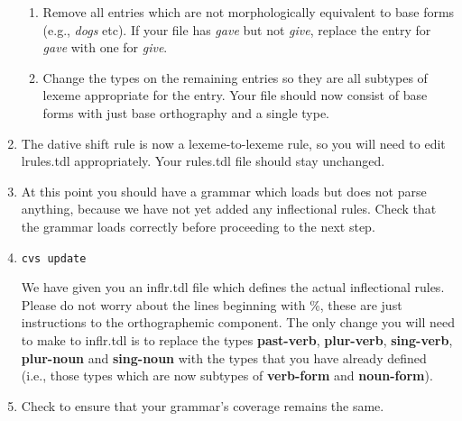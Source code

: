 \documentclass[10pt]{article}
\begin{document}
\begin{enumerate}
\begin{enumerate}
\item Remove all entries which
are not morphologically equivalent to
base forms (e.g., {\it dogs} etc).  If your file has {\it gave}
but not {\it give}, replace the entry for {\it gave} with one for {\it give}.
\item Change the types on the remaining entries so they are all
subtypes of lexeme appropriate for the entry.  Your file should
now consist of base forms with just base orthography and a single type.
\end{enumerate}
\item The dative shift rule is now a lexeme-to-lexeme rule, so you will need
to edit lrules.tdl appropriately.
Your rules.tdl file should stay unchanged.
\item At this point you should have a grammar which loads but does not parse anything, because we have not yet added any inflectional rules.  Check
that the grammar loads correctly before proceeding to the next step.
\item 
\begin{verbatim}
cvs update
\end{verbatim}
We have given you an
inflr.tdl file which defines the actual inflectional rules.
Please do not worry about the lines beginning with \%, these are just instructions to the orthographemic component.  The only change you will need to make to
inflr.tdl is to replace the types {\bf past-verb}, {\bf plur-verb},
{\bf sing-verb}, {\bf plur-noun} and {\bf sing-noun} with the types that
you have already defined (i.e., those types which are now subtypes of
{\bf verb-form} and {\bf noun-form}).
\item Check to ensure that your grammar's coverage remains the same.
\end{enumerate}
\end{document}
